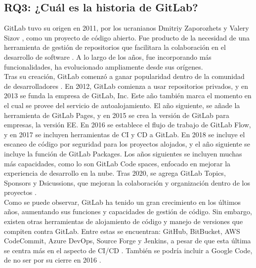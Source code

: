 \documentclass[runningheads]{llncs}
\begin{document}
\subsection{RQ3: ¿Cuál es la historia de GitLab?}
GitLab tuvo su origen en 2011, por los ucranianos Dmitriy Zaporozhets y Valery Sizov \cite{gitlab2022gitlab}, como un proyecto de código abierto. Fue
producto de la necesidad de una herramienta de gestión de repositorios que facilitara la colaboración en el desarrollo de software \cite{safari2020analysis}.
A lo largo de los años, fue incorporando más funcionalidades, ha evolucionado ampliamente desde sus orígenes.\\
Tras su creación, GitLab comenzó a ganar popularidad dentro de la comunidad de desarrolladores \cite{uddin2023comparative}. En 2012, GitLab comienza a usar
repositorios privados, y en 2013 se funda la empresa de GitLab, Inc. Este año también marca el momento en el cual se provee del servicio de autoalojamiento.
El año siguiente, se añade la herramienta de GitLab Pages, y en 2015 se crea la versión de GitLab para empresas, la versión EE. En 2016 se establece el flujo
de trabajo de GitLab Flow, y en 2017 se incluyen herramientas de CI y CD a GitLab. En 2018 se incluye el escaneo de código por seguridad para los proyectos
alojados, y el año siguiente se incluye la función de GitLab Packages. Los años siguientes se incluyen muchas más capacidades, como lo son GitLab Code spaces,
enfocado en mejorar la experiencia de desarrollo en la nube. Tras 2020, se agrega GitLab Topics, Sponsors y Dsicussions, que mejoran la colaboración y organización
dentro de los proyectos \cite{uddin2023comparative}.\\
Como se puede observar, GitLab ha tenido un gran crecimiento en los últimos años, aumentando sus funciones y capacidades de gestión de código. Sin embargo,
existen otras herramientas de alojamiento de código y manejo de versiones que compiten contra GitLab. Entre estas se encuentran: GitHub, BitBucket, AWS CodeCommit,
Azure DevOps, Source Forge y Jenkins, a pesar de que esta última se centra más en el aspecto de CI/CD \cite{ferdian2021continuous}. También se podría incluir a Google Code, de no ser por su cierre en 2016 \cite{safari2020analysis}.\\
\end{document}
